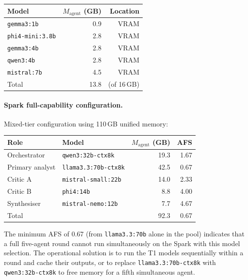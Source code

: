 \begin{center}
\begin{tabular}{lrr}
\toprule
Model & $M_{\text{agent}}$ (GB) & Location \\
\midrule
\texttt{gemma3:1b}    & 0.9 & VRAM \\
\texttt{phi4-mini:3.8b} & 2.8 & VRAM \\
\texttt{gemma3:4b}    & 2.8 & VRAM \\
\texttt{qwen3:4b}     & 2.8 & VRAM \\
\texttt{mistral:7b}   & 4.5 & VRAM \\
\midrule
Total & 13.8 & (of 16\,GB) \\
\bottomrule
\end{tabular}
\end{center}

\paragraph{Spark full-capability configuration.}
Mixed-tier configuration using 110\,GB unified memory:

\begin{center}
\begin{tabular}{llrr}
\toprule
Role & Model & $M_{\text{agent}}$ (GB) & AFS \\
\midrule
Orchestrator    & \texttt{qwen3:32b-ctx8k}            & 19.3 & 1.67 \\
Primary analyst & \texttt{llama3.3:70b-ctx8k}         & 42.5 & 0.67 \\
Critic A        & \texttt{mistral-small:22b}           & 14.0 & 2.33 \\
Critic B        & \texttt{phi4:14b}                   &  8.8 & 4.00 \\
Synthesiser     & \texttt{mistral-nemo:12b}            &  7.7 & 4.67 \\
\midrule
Total           &                                      & 92.3 & 0.67 \\
\bottomrule
\end{tabular}
\end{center}

\noindent The minimum AFS of 0.67 (from \texttt{llama3.3:70b} alone in
the pool) indicates that a full five-agent round cannot run simultaneously
on the Spark with this model selection. The operational solution is to
run the T1 models sequentially within a round and cache their outputs, or
to replace \texttt{llama3.3:70b-ctx8k} with \texttt{qwen3:32b-ctx8k} to
free memory for a fifth simultaneous agent.

